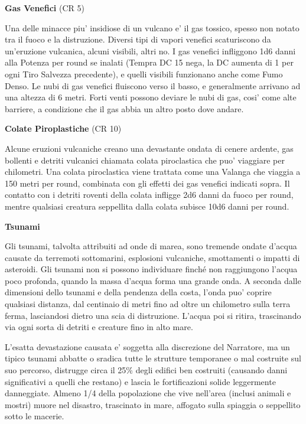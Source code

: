 \documentclass[a4paper,11pt,twoside,openany]{book}
\begin{document}
{		\textbf{Gas Venefici} (CR 5)
		
		Una delle minacce piu' insidiose di un vulcano e' il gas tossico, spesso non notato tra il fuoco e la distruzione. Diversi tipi di vapori venefici scaturiscono da un'eruzione vulcanica, alcuni visibili, altri no. I gas venefici infliggono 1d6 danni alla Potenza per round se inalati (Tempra DC 15 nega, la DC aumenta di 1 per ogni Tiro Salvezza precedente), e quelli visibili funzionano anche come Fumo Denso. Le nubi di gas venefici fluiscono verso il basso, e generalmente arrivano ad una altezza di 6 metri. Forti venti possono deviare le nubi di gas, cosi' come alte barriere, a condizione che il gas abbia un altro posto dove andare.
		
		\textbf{Colate Piroplastiche} (CR 10)
		
		Alcune eruzioni vulcaniche creano una devastante ondata di cenere ardente, gas bollenti e detriti vulcanici chiamata colata piroclastica che puo' viaggiare per chilometri. Una colata piroclastica viene trattata come una Valanga che viaggia a 150 metri per round, combinata con gli effetti dei gas venefici indicati sopra. Il contatto con i detriti roventi della colata infligge 2d6 danni da fuoco per round, mentre qualsiasi creatura seppellita dalla colata subisce 10d6 danni per round.
		
		\textbf{Tsunami}
		
		Gli tsunami, talvolta attribuiti ad onde di marea, sono tremende ondate d'acqua causate da terremoti sottomarini, esplosioni vulcaniche, smottamenti o impatti di asteroidi. Gli tsunami non si possono individuare finché non raggiungono l'acqua poco profonda, quando la massa d'acqua forma una grande onda. A seconda dalle dimensioni dello tsunami e del­la pendenza della costa, l'onda puo' coprire qualsiasi distanza, dal centinaio di metri fino ad oltre un chilometro sulla terra ferma, lasciandosi dietro una scia di distruzione. L'acqua poi si ritira, trascinando via ogni sorta di detriti e creature fino in alto mare.
		
		L'esatta devastazione causata e' soggetta alla discrezione del Narratore, ma un tipico tsunami abbatte o sradica tutte le strutture temporanee o mal costruite sul suo percorso, distrugge circa il 25\% degli edifici ben costruiti (causando danni significativi a quelli che restano) e lascia le fortificazioni solide leggermente danneggiate. Almeno 1/4 della popolazione che vive nell'area (inclusi animali e mostri) muore nel disastro, trascinato in mare, affogato sulla spiaggia o seppellito sotto le macerie.
		
}
\end{document}
